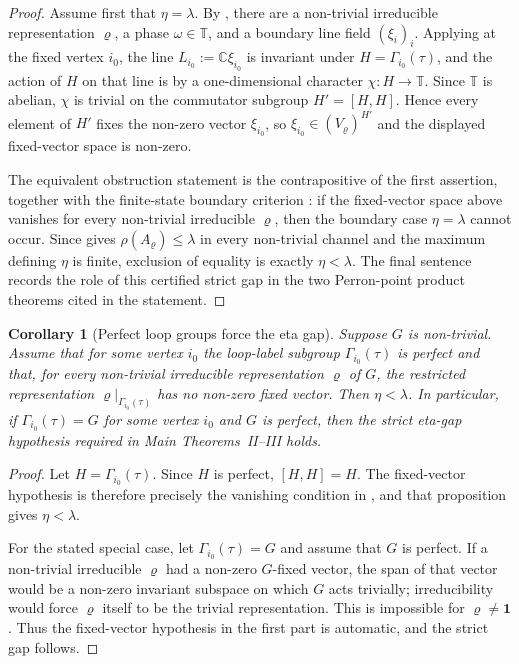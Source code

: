 \documentclass[11pt,a4paper]{amsart}
\theoremstyle{plain}
\newtheorem{corollary}[theorem]{Corollary}
\theoremstyle{definition}
\theoremstyle{remark}
\newcommand{\CC}{\mathbb{C}}
\newcommand{\TT}{\mathbb{T}}
\begin{document}
\begin{proof}
  Assume first that \(\eta=\lambda\).  By
  , there are a non-trivial
  irreducible representation \(\varrho\), a phase \(\omega\in\TT\), and a
  boundary line field \((\xi_i)_i\).  Applying
   at the fixed vertex
  \(i_0\), the line \(L_{i_0}:=\CC\xi_{i_0}\) is invariant under
  \(H=\Gamma_{i_0}(\tau)\), and the action of \(H\) on that line is by a
  one-dimensional character \(\chi:H\to\TT\).  Since \(\TT\) is abelian,
  \(\chi\) is trivial on the commutator subgroup \(H'=[H,H]\).  Hence
  every element of \(H'\) fixes the non-zero vector \(\xi_{i_0}\), so
  \(\xi_{i_0}\in(V_\varrho)^{H'}\) and the displayed fixed-vector space is
  non-zero.

  The equivalent obstruction statement is the contrapositive of the first
  assertion, together with the finite-state boundary criterion
  : if the fixed-vector space above
  vanishes for every non-trivial irreducible \(\varrho\), then the
  boundary case \(\eta=\lambda\) cannot occur.  Since
   gives
  \(\rho(A_\varrho)\le\lambda\) in every non-trivial channel and the
  maximum defining \(\eta\) is finite, exclusion of equality is exactly
  \(\eta<\lambda\).  The final sentence records the role of this certified
  strict gap in the two Perron-point product theorems cited in the
  statement.
\end{proof}

\begin{corollary}[Perfect loop groups force the eta gap]
  \label{cor:eta-gap-perfect-group}
  Suppose \(G\) is non-trivial. Assume that for some vertex \(i_0\) the
  loop-label subgroup \(\Gamma_{i_0}(\tau)\) is perfect and that, for every
  non-trivial irreducible representation \(\varrho\) of \(G\), the restricted
  representation \(\varrho|_{\Gamma_{i_0}(\tau)}\) has no non-zero fixed
  vector. Then \(\eta<\lambda\). In particular, if
  \(\Gamma_{i_0}(\tau)=G\) for some vertex \(i_0\) and \(G\) is perfect, then
  the strict eta-gap hypothesis required in Main Theorems~II--III holds.
\end{corollary}

\begin{proof}
  Let \(H=\Gamma_{i_0}(\tau)\).  Since \(H\) is perfect, \([H,H]=H\).  The
  fixed-vector hypothesis is therefore precisely the vanishing condition in
  , and that proposition gives
  \(\eta<\lambda\).

  For the stated special case, let \(\Gamma_{i_0}(\tau)=G\) and assume that
  \(G\) is perfect. If a non-trivial irreducible \(\varrho\) had a non-zero
  \(G\)-fixed vector, the span of that vector would be a
  non-zero invariant subspace on which \(G\) acts trivially; irreducibility
  would force \(\varrho\) itself to be the trivial representation. This is
  impossible for \(\varrho\neq\mathbf1\). Thus the fixed-vector hypothesis
  in the first part is automatic, and the strict gap follows.
\end{proof}
\end{document}
